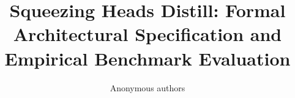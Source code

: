 \title{\textbf{Squeezing Heads Distill: Formal Architectural Specification and Empirical Benchmark Evaluation}}

\author{Anonymous authors}
